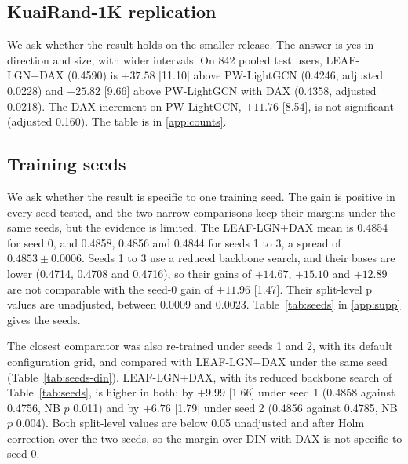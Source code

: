 \documentclass[preprint,12pt,authoryear]{elsarticle}
\begin{document}
\subsection{KuaiRand-1K replication}
\label{sec:res-1k}

We ask whether the result holds on the smaller release. The answer is yes in direction and size, with wider intervals. On 842 pooled test users,
LEAF-LGN+DAX (0.4590) is $+37.58$ [11.10] above PW-LightGCN (0.4246, adjusted 0.0228) and $+25.82$ [9.66] above PW-LightGCN with DAX (0.4358, adjusted
0.0218). The DAX increment on PW-LightGCN, $+11.76$ [8.54], is not significant (adjusted 0.160). The table is in \ref{app:counts}.

\subsection{Training seeds}
\label{sec:res-seeds}

We ask whether the result is specific to one training seed. The gain is positive in every seed tested, and the two narrow comparisons keep their margins under the same seeds, but the evidence is limited. The LEAF-LGN+DAX mean is
0.4854 for seed 0, and 0.4858, 0.4856 and 0.4844 for seeds 1 to 3, a spread of $0.4853\pm0.0006$. Seeds 1 to 3 use a reduced backbone search, and their
bases are lower (0.4714, 0.4708 and 0.4716), so their gains of $+14.67$, $+15.10$ and $+12.89$ are not comparable with the seed-0 gain of $+11.96$ [1.47].
Their split-level p values are unadjusted, between 0.0009 and 0.0023. Table~\ref{tab:seeds} in \ref{app:supp} gives the seeds.

The closest comparator was also re-trained under seeds 1 and 2, with its default configuration grid, and compared with LEAF-LGN+DAX under
the same seed (Table~\ref{tab:seeds-din}). LEAF-LGN+DAX, with its reduced backbone search of Table~\ref{tab:seeds}, is higher in both: by $+9.99$ [1.66] under seed 1 (0.4858 against 0.4756, NB $p$
0.011) and by $+6.76$ [1.79] under seed 2 (0.4856 against 0.4785, NB $p$ 0.004). Both split-level values are below 0.05 unadjusted and after
Holm correction over the two seeds, so the margin over DIN with DAX is not specific to seed 0. 
\end{document}
